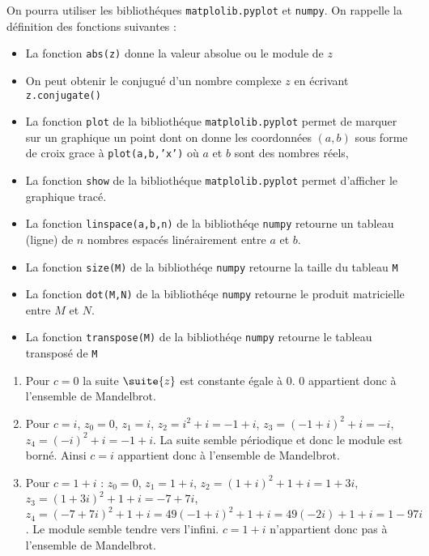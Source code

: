 \documentclass[a4paper, 11pt,reqno]{article}
\begin{document}
On pourra utiliser les bibliothéques \texttt{matplolib.pyplot} et  \texttt{numpy}.
On rappelle la définition des fonctions suivantes : 
\begin{itemize}
\item La fonction \texttt{abs(z)} donne la valeur absolue ou le module de $z$ 
\item On peut obtenir le conjugué d'un nombre complexe $z$ en écrivant \texttt{z.conjugate()}
\item La fonction \texttt{plot} de la bibliothéque \texttt{matplolib.pyplot} permet de  marquer sur un graphique un point dont on donne les  coordonnées $(a,b)$ sous forme de croix grace à  \texttt{plot(a,b,'x')} où $a$ et $b$ sont des nombres réels, 
\item  La fonction \texttt{show} de la bibliothéque \texttt{matplolib.pyplot}   permet d'afficher le graphique tracé. 
\item La fonction \texttt{linspace(a,b,n)} de la bibliothéqe \texttt{numpy} retourne un tableau (ligne) de $n$ nombres espacés linérairement entre $a$ et $b$.
\item La fonction \texttt{size(M)} de  la bibliothéqe \texttt{numpy} retourne la taille du tableau \texttt{M}
\item La fonction \texttt{dot(M,N)} de  la bibliothéqe \texttt{numpy} retourne le produit matricielle entre $M$ et $N$.
\item  La fonction \texttt{transpose(M)} de  la bibliothéqe \texttt{numpy} retourne le  tableau transposé de  \texttt{M}
\end{itemize}


\begin{correction}
\begin{enumerate}
\item Pour $c=0$ la suite $\suite{z}$ est constante égale à $0$. $0$ appartient donc à l'ensemble de Mandelbrot. 
\item Pour $c=i$, $z_0=0$, $z_1=i$, $z_2= i^2+i=-1+i$, $z_3= (-1+i)^2 +i = -i$, $z_4=(-i)^2+i = -1+i$. La suite semble périodique et donc le module est borné. Ainsi $c=i$  appartient donc à l'ensemble de Mandelbrot. 

\item Pour $c=1+i$ : $z_0=0$, $z_1=1+i$, $z_2=(1+i)^2+1+i=1+3i$, $z_3= (1+3i)^2 +1+i = -7+7i$, $z_4=(-7+7i)^2+1+i= 49(-1+i)^2+1+i = 49(-2i) +1+i = 1-97i$. Le module semble tendre vers l'infini. 
$c=1+i$ n'appartient donc pas à l'ensemble de Mandelbrot. 


\end{enumerate}
\end{correction}
\end{document}
